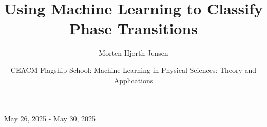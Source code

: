 \documentclass{beamer}
\begin{document}

\newcommand{\exercisesection}[1]{\subsection*{#1}}







\title{Using Machine Learning to Classify Phase Transitions}


\author{Morten Hjorth-Jensen}

\date{CEACM Flagship School: Machine Learning in Physical Sciences: Theory and Applications
}

May 26, 2025 - May 30, 2025

\begin{frame}
\titlepage
\end{frame}
\end{document}
